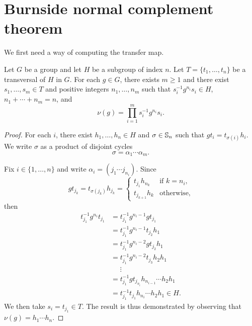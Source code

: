 
\section{Burnside normal complement theorem}

We first need a way of computing the transfer map.

\begin{lemma}
	\label{lem:evaluation}
	Let $G$ be a group and let $H$ be a subgroup of index $n$. Let $T=\{t_1,\dots,t_n\}$ be a transversal of $H$ in $G$. For each $g \in G$, there exists $m\geq1$ and there exist $s_{1},\dots,s_{m} \in T$ and positive integers $n_1,\dots,n_m$ such that $s_i^{-1}g^{n_i}s_i \in H$, $n_1+\cdots+n_m=n$, and 
	\[
		\nu(g)=\prod_{i=1}^m s_i^{-1}g^{n_i}s_i.
	\]
\end{lemma}

\begin{proof}
	For each $i$, there exist $h_1,\dots,h_n\in H$ and $\sigma\in\mathbb{S}_n$ such that $gt_i=t_{\sigma(i)}h_i$. We write $\sigma$ as a product of disjoint cycles
	\[
		\sigma=\alpha_1\cdots\alpha_m.
	\]

	Fix $i\in\{1,\dots,n\}$ and write    
	$\alpha_i=(j_{1}\cdots j_{n_i})$. Since  
	\[
		g t_{j_k}=t_{\sigma(j_k)}h_{j_k}=\begin{cases}
			t_{j_1}h_{n_k} & \text{if $k=n_i$},\\
			t_{j_{k+1}}h_{k} & \text{otherwise},
		\end{cases}
	\]
	then 
	\begin{align*}
	t_{j_1}^{-1}g^{n_i}t_{j_1}
	&=t_{j_1}^{-1}g^{n_i-1}gt_{j_1}\\
	&=t_{j_1}^{-1}g^{n_i-1}t_{j_2}h_1\\
	&=t_{j_1}^{-1}g^{n_i-2}gt_{j_2}h_1\\
	&=t_{j_1}^{-1}g^{n_i-2}t_{j_3}h_2h_1\\
	&\phantom{=}\vdots\\
	&=t_{j_1}^{-1}gt_{j_{n_i}}h_{n_{i-1}}\cdots h_2h_1\\
	&=t_{j_1}^{-1}t_{j_1}h_{n_i}\cdots h_2h_1\in H. 	
	\end{align*}
	We then take $s_i=t_{j_1}\in T$. The result is thus demonstrated by observing that $\nu(g)=h_1\cdots h_n$. 
\end{proof}


